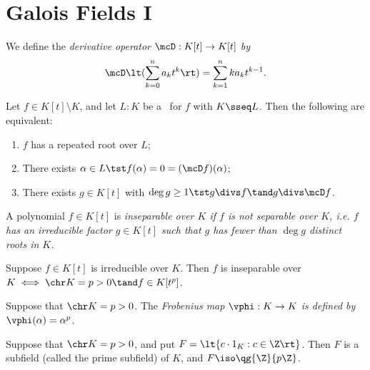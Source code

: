 \documentclass[a4paper]{article}
\begin{document}
\section{Galois Fields I}
\begin{tdefinition}
  We define the \it{derivative operator} \( \mcD:K[t]\to K[t] \) by \begin{align*}
    \mcD\lt(\sum_{k=0}^{n}a_kt^k\rt) = \sum_{k=1}^{n}ka_kt^{k-1}.
  \end{align*}
\end{tdefinition}

\begin{ttheorem}
  Let \( f\in K[t]\setminus K \), and let \( L:K \) be a \sfe~for \( f \) with \( K\sseq L \).
  Then the following are equivalent: \begin{enumerate}[label=(\roman*)]
    \item \( f \) has a repeated root over \( L \);
    \item There exists \( \alpha\in L \tst f(\alpha)=0=(\mcD f)(\alpha) \);
    \item There exists \( g\in K[t] \) with \( \deg g \geq 1 \tst g \divs f \tand g\divs\mcD f \).
  \end{enumerate}
\end{ttheorem}

\begin{tdefinition}[Inseparable]
  A polynomial \( f \in K[t] \) is \it{inseparable over \( K \)} if \( f \) is not separable over \( K \), i.e. \( f \) has an irreducible factor \( g \in K[t] \) such that \( g \) has fewer than \( \deg g \) distinct roots in \( K \).
\end{tdefinition}

\begin{ttheorem}
  Suppose \( f\in K[t] \) is irreducible over \( K \).
  Then \( f \) is inseparable over \( K \iff \chr K=p>0 \tand f \in K[t^p]\).
\end{ttheorem}

\begin{tdefinition}
  Suppose that \( \chr K = p > 0 \).
  The \it{Frobenius map} \( \vphi:K\to K \) is defined by \( \vphi(\alpha)=\alpha^p \).
\end{tdefinition}

\begin{ttheorem}
  Suppose that \( \chr K = p > 0 \), and put \( F=\lt\{ c\cdot 1_K : c\in \Z \rt\} \).
  Then \( F \) is a subfield (called the prime subfield) of \( K \), and \( F\iso \qg{\Z}{p\Z} \).
\end{ttheorem}
\end{document}
